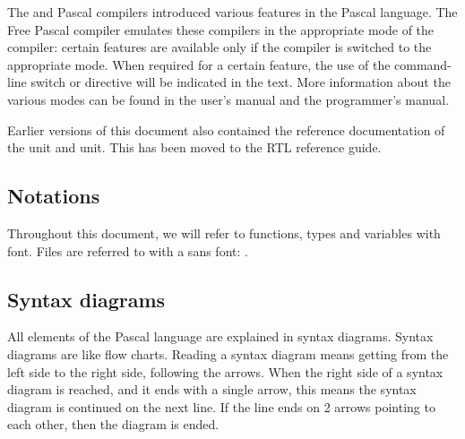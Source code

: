 The \tp and \delphi Pascal compilers introduced various features in the 
Pascal language. The Free Pascal compiler emulates these compilers in the
appropriate mode of the compiler: certain features are available only
if the compiler is switched to the appropriate mode. When required for 
a certain feature, the use of the  command-line switch or 
 directive will be indicated in the text. More information
about the various modes can be found in the user's manual and the
programmer's manual.

Earlier versions of this document also contained the reference documentation
of the  unit and  unit. This has been moved to the 
RTL reference guide.

\subsection*{Notations}
Throughout this document, we will refer to functions, types and variables
with  font. Files are referred to with a sans font:
.

\subsection*{Syntax diagrams}
All elements of the Pascal language are explained in syntax diagrams.
Syntax diagrams are like flow charts. Reading a syntax diagram means getting
from the left side to the right side, following the arrows.
When the right side of a syntax diagram is reached, and it ends with a single
arrow, this means the syntax diagram is continued on the next line. If
the line ends on 2 arrows pointing to each other, then the diagram is
ended.

